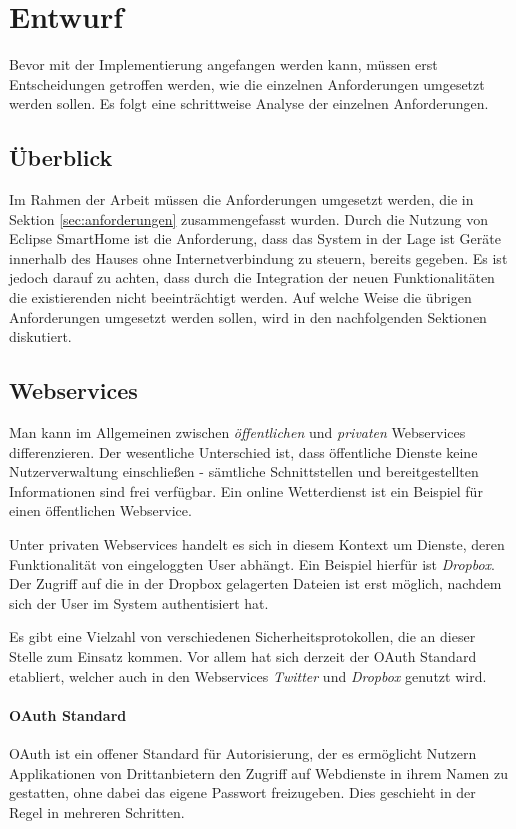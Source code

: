 \chapter{Entwurf}
\label{chap:entwurf}
Bevor mit der Implementierung angefangen werden kann, müssen erst Entscheidungen
getroffen werden, wie die einzelnen Anforderungen umgesetzt werden sollen. Es folgt eine
schrittweise Analyse der einzelnen Anforderungen.

\section{Überblick}
Im Rahmen der Arbeit müssen die Anforderungen umgesetzt werden, die in Sektion \ref{sec:anforderungen} zusammengefasst wurden. Durch die Nutzung von Eclipse SmartHome ist die Anforderung, dass das System in der Lage ist Geräte innerhalb des Hauses ohne Internetverbindung zu steuern, bereits gegeben. Es ist jedoch darauf zu achten, dass durch die Integration der neuen Funktionalitäten die existierenden nicht beeinträchtigt werden.
Auf welche Weise die übrigen Anforderungen umgesetzt werden sollen, wird in den nachfolgenden Sektionen diskutiert.


\section{Webservices}
Man kann im Allgemeinen zwischen \textit{öffentlichen} und \textit{privaten} Webservices differenzieren. Der wesentliche Unterschied ist, dass öffentliche Dienste keine Nutzerverwaltung einschließen - sämtliche Schnittstellen und bereitgestellten Informationen sind frei verfügbar. Ein online Wetterdienst ist ein Beispiel für einen öffentlichen Webservice. 

Unter privaten Webservices handelt es sich in diesem Kontext um Dienste, deren Funktionalität von eingeloggten User abhängt. Ein Beispiel hierfür ist \textit{Dropbox}. Der Zugriff auf die in der Dropbox gelagerten Dateien ist erst möglich, nachdem sich der User im System authentisiert hat. 

Es gibt eine Vielzahl von verschiedenen Sicherheitsprotokollen, die an dieser Stelle zum Einsatz kommen. Vor allem hat sich derzeit der OAuth Standard etabliert, welcher auch in den Webservices \textit{Twitter} und \textit{Dropbox} genutzt wird.\\

\subsubsection{OAuth Standard}
\label{subsubsec:oauth}
OAuth ist ein offener Standard für Autorisierung, der es ermöglicht Nutzern Applikationen von Drittanbietern den Zugriff auf Webdienste in ihrem Namen zu gestatten, ohne dabei das eigene Passwort freizugeben. Dies geschieht in der Regel in mehreren Schritten.

